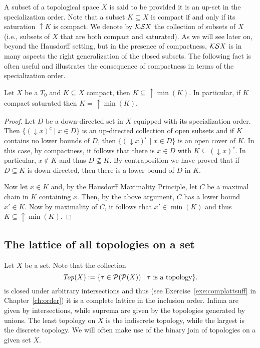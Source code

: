 A subset of a topological space $X$ is said to be  provided it is an up-set in the specialization order. Note that a subset $K\subseteq X$ is compact if and only if its saturation ${\uparrow} K$ is compact. We denote by $\mathcal{KS} X$ the collection of  subsets of $X$ (i.e., subsets of $X$ that are both compact and saturated). As we will see later on, beyond the Hausdorff setting, but in the presence of compactness, $\mathcal{KS} X$ is in many aspects the right generalization of the closed subsets. The following fact is often useful and illustrates the consequence of compactness in terms of the specialization order.

\begin{proposition}\label{prop:compact-implies minpoints}
Let $X$ be a $T_0$ and $K\subseteq X$ compact, then $K\subseteq {\uparrow}\min(K)$. In particular, if $K$ compact saturated then $K= {\uparrow}\min(K)$. 
\end{proposition}

\begin{proof}
Let $D$ be a down-directed set in $X$ equipped with its specialization order. Then $\{({\downarrow }x)^c\mid x\in D\}$ is an up-directed collection of open subsets and if $K$ contains no lower bounds of $D$, then $\{({\downarrow }x)^c\mid x\in D\}$ is an open cover of $K$. In this case, by compactness, it follows that there is $x\in D$ with $K\subseteq ({\downarrow }x)^c$. In particular, $x\not\in K$ and thus $D\not\subseteq K$. By contraposition we have proved that if $D\subseteq K$ is down-directed, then there is a lower bound of $D$ in $K$. 

Now let $x\in K$ and, by the Hausdorff Maximality Principle, let $C$ be a maximal chain in $K$ containing $x$. Then, by the above argument, $C$ has a lower bound $x'\in K$. Now by maximality of $C$, it follows that $x'\in\min(K)$ and thus $K\subseteq {\uparrow}\min(K)$.
\end{proof}

\subsection*{The lattice of all topologies on a set}

Let $X$ be a set. Note that the collection  
\[
\mathit{Top}(X):=\{\tau\in\mathcal{P}(\mathcal{P}(X))\mid \tau \text{ is a topology}\}.
\]
is closed under arbitrary intersections and thus (see Exercise~\ref{exe:complattsuff} in Chapter~\ref{ch:order}) it is a complete lattice in the inclusion order. Infima are given by intersections, while suprema are given by the topologies generated by unions. The least topology on $X$ is the indiscrete topology, while the largest is the discrete topology. We will often make use of the binary join of topologies on a given set $X$.

